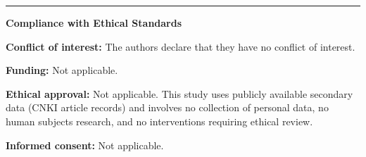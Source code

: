 \documentclass[12pt,a4paper]{article}
\begin{document}
\bigskip\hrule\bigskip

\noindent\textbf{Compliance with Ethical Standards}

\medskip
\noindent\textbf{Conflict of interest:} The authors declare that they have
no conflict of interest.

\medskip
\noindent\textbf{Funding:} Not applicable.

\medskip
\noindent\textbf{Ethical approval:} Not applicable.
This study uses publicly available secondary data (CNKI article records)
and involves no collection of personal data, no human subjects research,
and no interventions requiring ethical review.

\medskip
\noindent\textbf{Informed consent:} Not applicable.
\end{document}
